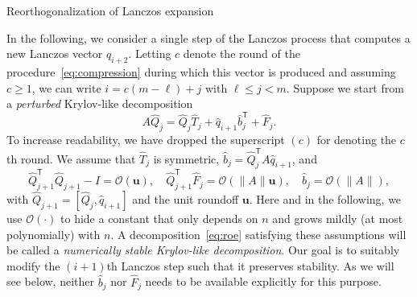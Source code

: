 \documentclass{siamart190516}
\newcommand{\Ttran}{\mathsf{T}}
\newcommand{\order}{\mathcal{O}}
\newcommand{\mpr}{\mathbf{u}}
\providecommand{\norm}[1]{\lVert#1\rVert}
\begin{document}
\begin{paragraph}{Reorthogonalization of Lanczos expansion}

In the following, we consider a single step of the Lanczos process that computes a new Lanczos vector $q_{i+2}$. Letting $c$ denote the round of the procedure~\cref{eq:compression} during which this vector is produced and assuming $c \ge 1$, we can write 
$i=c(m-\ell)+j$ with $\ell\leq j< m$. Suppose we start from a \emph{perturbed} Krylov-like decomposition
\begin{equation}
\label{eq:roe}
    A\widehat{Q}_{j} = \widehat{Q}_{j}\widehat{T}_{j}+\widehat{q}_{i+1}\widehat{b}_{j}^{\Ttran}+\widehat{F}_{j}.
\end{equation}
To increase readability, we have dropped the superscript $(c)$ for denoting the $c$th round.
We assume that 
$\widehat{T}_{j}$ is symmetric, $\widehat{b}_{j}=\widehat{Q}_{j}^{\Ttran}A\widehat{q}_{i+1}$, and 
\begin{equation} \label{eq:roe2}
    \widehat{Q}_{j+1}^{\Ttran}\widehat{Q}_{j+1}-I = \order(\mpr),\quad 
    \widehat{Q}_{j+1}^{\Ttran}\widehat{F}_{j} = \order(\norm{A}\mpr),\quad 
    \widehat{b}_{j} = \order(\norm{A}),
\end{equation}
with $\widehat{Q}_{j+1} = [\widehat{Q}_{j},\widehat{q}_{i+1}]$ and the unit roundoff $\mpr$.
Here and in the following, we use $\order(\cdot)$ to hide a constant that only depends on $n$ and grows mildly (at most polynomially) with $n$.  A decomposition~\eqref{eq:roe} satisfying these assumptions will be called a \emph{numerically stable Krylov-like decomposition}.
Our goal is to suitably modify the $(i+1)$th Lanczos step such that it preserves stability.
As we will see below, neither $\widehat{b}_{j}$ nor $\widehat{F}_{j}$ needs to be available explicitly for this purpose.


\end{paragraph}
\end{document}

